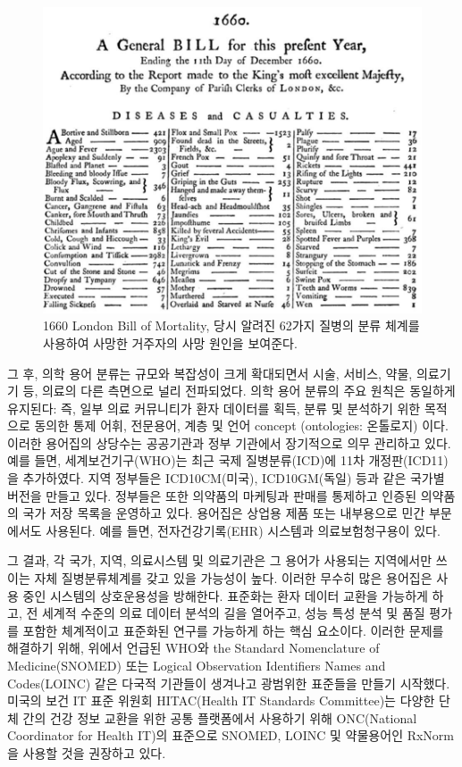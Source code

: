 \documentclass[11pt]{book}
\theoremstyle{definition}
\theoremstyle{definition}
\theoremstyle{definition}
\theoremstyle{remark}
\begin{document}
\begin{figure}

{\centering \includegraphics[width=1\linewidth]{images/StandardizedVocabularies/bill} 

}

\caption{1660 London Bill of Mortality, 당시 알려진 62가지 질병의 분류 체계를 사용하여 사망한 거주자의 사망 원인을 보여준다.}\label{fig:bill}
\end{figure}

그 후, 의학 용어 분류는 규모와 복잡성이 크게 확대되면서 시술, 서비스,
약물, 의료기기 등, 의료의 다른 측면으로 널리 전파되었다. 의학 용어
분류의 주요 원칙은 동일하게 유지된다: 즉, 일부 의료 커뮤니티가 환자
데이터를 획득, 분류 및 분석하기 위한 목적으로 동의한 통제 어휘,
전문용어, 계층 및 언어 concept (ontologies: 온톨로지) 이다. 이러한
용어집의 상당수는 공공기관과 정부 기관에서 장기적으로 의무 관리하고
있다. 예를 들면, 세계보건기구(WHO)는 최근 국제 질병분류(ICD)에 11차
개정판(ICD11)을 추가하였다. 지역 정부들은 ICD10CM(미국), ICD10GM(독일)
등과 같은 국가별 버전을 만들고 있다. 정부들은 또한 의약품의 마케팅과
판매를 통제하고 인증된 의약품의 국가 저장 목록을 운영하고 있다. 용어집은
상업용 제품 또는 내부용으로 민간 부문에서도 사용된다. 예를 들면,
전자건강기록(EHR) 시스템과 의료보험청구용이 있다.

그 결과, 각 국가, 지역, 의료시스템 및 의료기관은 그 용어가 사용되는
지역에서만 쓰이는 자체 질병분류체계를 갖고 있을 가능성이 높다. 이러한
무수히 많은 용어집은 사용 중인 시스템의 상호운용성을 방해한다. 표준화는
환자 데이터 교환을 가능하게 하고, 전 세계적 수준의 의료 데이터 분석의
길을 열어주고, 성능 특성 분석 및 품질 평가를 포함한 체계적이고 표준화된
연구를 가능하게 하는 핵심 요소이다. 이러한 문제를 해결하기 위해, 위에서
언급된 WHO와 the Standard Nomenclature of Medicine(SNOMED) 또는 Logical
Observation Identifiers Names and Codes(LOINC) 같은 다국적 기관들이
생겨나고 광범위한 표준들을 만들기 시작했다. 미국의 보건 IT 표준 위원회
HITAC(Health IT Standards Committee)는 다양한 단체 간의 건강 정보 교환을
위한 공통 플랫폼에서 사용하기 위해 ONC(National Coordinator for Health
IT)의 표준으로 SNOMED, LOINC 및 약물용어인 RxNorm을 사용할 것을 권장하고
있다.
\end{document}
